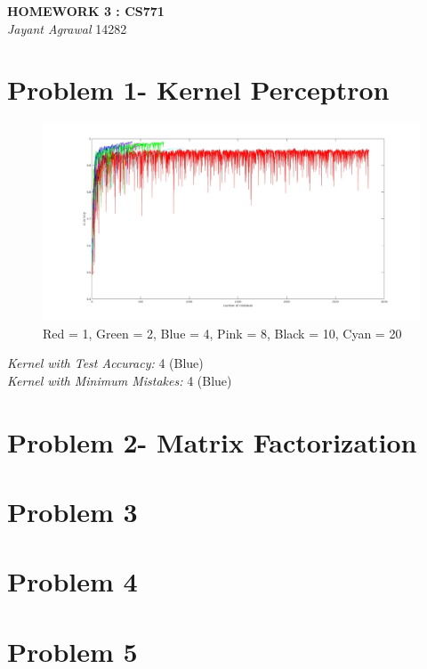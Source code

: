 \documentclass{article}
\begin{document}

\begin{center}
\textbf{\Large HOMEWORK 3 : CS771} \\
\textit{\large Jayant Agrawal}         14282
\end{center}
\section{Problem 1- Kernel Perceptron}
\begin{figure}[h!]
\centering
\includegraphics[width=1\columnwidth]{plot_acc.jpg}
\caption{Red = 1, Green = 2, Blue = 4, Pink = 8, Black = 10, Cyan = 20}
\label{acc}
\end{figure}
\begin{center}
\emph{Kernel with Test Accuracy: }4 (Blue)\\ 
\emph{Kernel with Minimum Mistakes: }4 (Blue) 
\end{center}

\section{Problem 2- Matrix Factorization}
\section{Problem 3}
\section{Problem 4}
\section{Problem 5}
\end{document}
